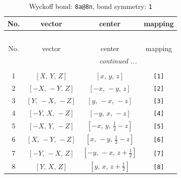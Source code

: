 \documentclass[fleqn,8pt]{jsarticle}
\begin{document}
\begin{longtable}{cccc}
\caption{Wyckoff bond: {\tt 8a@8n}, bond symmetry: {\tt 1}}
 \\
 \hline \hline
No. & vector & center & mapping \\ \hline \endfirsthead

\multicolumn{3}{l}{\tablename\ \thetable{}} \\
 \hline \hline
No. & vector & center & mapping \\ \hline \endhead

 \hline \hline
\multicolumn{3}{r}{\footnotesize\it continued ...} \\ \endfoot

 \hline \hline
\multicolumn{3}{r}{} \\ \endlastfoot

1 & $\left[ X,\, Y,\, Z \right]$ & $\left[ x,\, y,\, z \right]$ & {\tt [1]} \\ \hline
2 & $\left[ - X,\, - Y,\, Z \right]$ & $\left[ - x,\, - y,\, z \right]$ & {\tt [2]} \\ \hline
3 & $\left[ Y,\, - X,\, - Z \right]$ & $\left[ y,\, - x,\, - z \right]$ & {\tt [3]} \\ \hline
4 & $\left[ - Y,\, X,\, - Z \right]$ & $\left[ - y,\, x,\, - z \right]$ & {\tt [4]} \\ \hline
5 & $\left[ - X,\, Y,\, - Z \right]$ & $\left[ - x,\, y,\, \frac{1}{2} - z \right]$ & {\tt [5]} \\ \hline
6 & $\left[ X,\, - Y,\, - Z \right]$ & $\left[ x,\, - y,\, \frac{1}{2} - z \right]$ & {\tt [6]} \\ \hline
7 & $\left[ - Y,\, - X,\, Z \right]$ & $\left[ - y,\, - x,\, z + \frac{1}{2} \right]$ & {\tt [7]} \\ \hline
8 & $\left[ Y,\, X,\, Z \right]$ & $\left[ y,\, x,\, z + \frac{1}{2} \right]$ & {\tt [8]} \\
\end{longtable}
\end{document}
